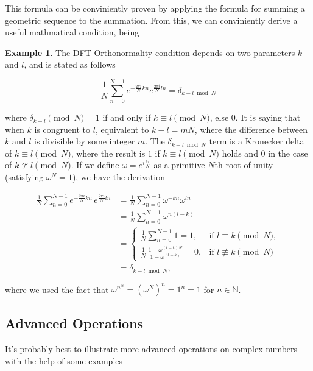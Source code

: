 \documentclass[12pt]{article}
\theoremstyle{definition}
\newtheorem*{example}{Example}
\begin{document}
This formula can be conviniently proven by applying the formula for summing a geometric sequence to the summation. From this, we can conviniently derive a useful mathmatical condition, being

\begin{example}
    The DFT Orthonormality condition depends on two parameters $k$ and $l$, and is stated as follows

    $$
    \frac{1}{N} \sum_{n=0}^{N-1}e^{- \frac{2 \pi i}{N}kn} e^{\frac{2 \pi i}{N} ln} = \delta_{k-l \bmod N}
    $$
\end{example}

where $\delta_{k-l} \pmod{N} = 1$ if and only if $k \equiv l \pmod{N}$, else $0$. It is saying that when $k$ is congruent to $l$, equivalent to $k - l = mN$, where the difference between $k$ and $l$ is divisible by some integer $m$. The $\delta_{k-l \bmod N}$ term is a Kronecker delta of $k \equiv l \pmod{N}$, where the result is $1$ if $k \equiv l \pmod{N}$ holds and $0$ in the case of $k \ncong l \pmod{N}$. If we define $\omega = \displaystyle  e^{i \frac{2 \pi}{N}}$ as a primitive $N$th root of unity (satisfying $\omega^N = 1$), we have the derivation

$$
\begin{aligned}
\frac{1}{N}\sum_{n=0}^{N-1} e^{-\frac{2\pi i}{N}kn}\, e^{\frac{2\pi i}{N}ln}
&= \frac{1}{N}\sum_{n=0}^{N-1} \omega^{-kn}\omega^{ln} \\
&= \frac{1}{N}\sum_{n=0}^{N-1} \omega^{n(l-k)} \\
&=
\begin{cases}
\displaystyle \frac{1}{N}\sum_{n=0}^{N-1} 1 = 1, & \text{if } l \equiv k \pmod N,\\
\displaystyle \frac{1}{N}\,\frac{1-\omega^{(l-k)N}}{1-\omega^{(l-k)}} = 0, & \text{if } l \not\equiv k \pmod N
\end{cases}
\\
&= \delta_{k-l \bmod N},
\end{aligned}
$$

where we used the fact that $\omega^{n^N} = \left(\omega^N\right)^n = 1^n = 1$ for $n \in \mathbb{N}$.

\subsection{Advanced Operations}

It's probably best to illustrate more advanced operations on complex numbers with the help of some examples
\end{document}
